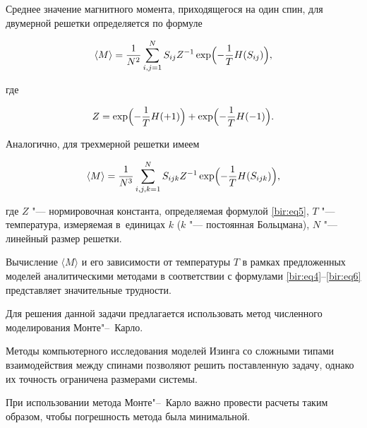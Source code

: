 Среднее значение магнитного момента, приходящегося на один спин, для двумерной решетки определяется по формуле

\begin{equation}

\langle M \rangle = \frac{1}{N^2} \sum^N_{i,j=1}{S_{ij} Z^{-1} \exp \Bigl(- \dfrac{1}{T} H(S_{ij}) \Bigr)} ,\label{bir:eq4}

\end{equation}

где

\begin{equation}

Z = \exp\Bigl({- \dfrac{1}{T} H(+1)}\Bigr) + \exp \Bigl({- \dfrac{1}{T} H(-1)}\Bigr).

\label{bir:eq5}

\end{equation}

Аналогично, для трехмерной решетки имеем

\begin{equation}

\langle M \rangle =  \frac{1}{N^3}\sum^N_{i,j,k=1}{S_{ijk} Z^{-1} \exp \Bigl({- \dfrac{1}{T} H(S_{ijk})}\Bigr)} ,\label{bir:eq6}

\end{equation}

где $Z$ "--- нормировочная константа, определяемая формулой \eqref{bir:eq5}, $T$ "--- температура, измеряемая в~единицах $k$ ($k$ "--- постоянная Больцмана), $N$ "--- линейный размер решетки.



\smallskip




Вычисление $\langle M \rangle$ и его зависимости от температуры $T$ в рамках предложенных моделей аналитическими методами в соответствии с формулами \eqref{bir:eq4}--\eqref{bir:eq6} представляет значительные трудности. 

Для решения данной задачи предлагается использовать метод численного моделирования Монте"--~Карло.

Методы компьютерного исследования моделей Изинга со сложными типами взаимодействия между спинами позволяют решить поставленную задачу, однако их точность ограничена размерами системы.

При использовании метода Монте"--~Карло важно провести расчеты таким образом, чтобы погрешность метода была минимальной. 

